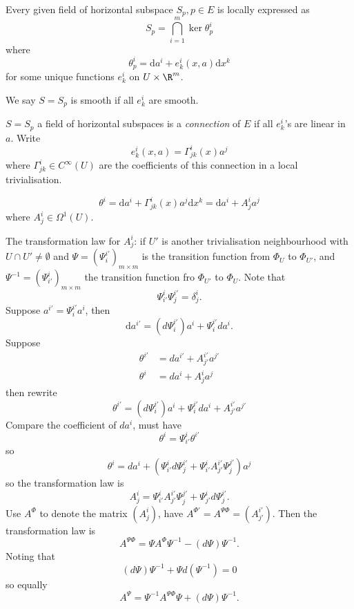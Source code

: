 \documentclass[a4paper]{article}
\begin{document}
\begin{proposition}
  Every given field of horizontal subspace \(S_p, p \in E\) is locally expressed as
  \[
    S_p = \bigcap_{i = 1}^m \ker \theta_p^i
  \]
  where
  \[
    \theta_p^i = \mathrm d a^i + e_k^i(x, a) \mathrm dx^k
  \]
  for some unique functions \(e_k^i\) on \(U \times \R^m\).

  We say \(S = S_p\) is smooth if all \(e_k^i\) are smooth.
\end{proposition}

\begin{definition}[connection]
  \(S = S_p\) a field of horizontal subspaces is a \emph{connection} of \(E\) if all \(e_k^i\)'s are linear in \(a\). Write
  \[
    e_k^i(x, a) = \Gamma_{jk}^i (x) a^j
  \]
  where \(\Gamma_{jk}^i \in C^\infty(U)\) are the coefficients of this connection in a local trivialisation.
\end{definition}

\[
  \theta^i = \mathrm d a^i + \Gamma_{jk}^i(x) a^j \mathrm dx^k
  = \mathrm d a^i + A^i_ja^j
\]
where \(A^i_j \in \Omega^1(U)\).

The transformation law for \(A^i_j\): if \(U'\) is another trivialisation neighbourhood with \(U \cap U' \neq \emptyset\) and \(\Psi = (\Psi^{i'}_i)_{m \times m}\) is the transition function from \(\Phi_U\) to \(\Phi_{U'}\), and \(\Psi^{-1} = (\Psi^i_{i'})_{m \times m}\) the transition function fro \(\Phi_{U'}\) to \(\Phi_U\). Note that
\[
  \Psi_{i'}^i \Psi_j^{i'} = \delta_j^i.
\]
Suppose \(a^{i'} = \Psi_i^{i'} a^i\), then
\[
  \mathrm d a^{i'} = (d \Psi_i^{i'}) a^i + \Psi_i^{i'} da^i.
\]
Suppose
\begin{align*}
  \theta^{i'} &= d a^{i'} + A_{j'}^{i'} a^{j'} \\
  \theta^i &= da^i + A_j^i a^j
\end{align*}
then rewrite
\[
  \theta^{i'} = (d \Psi_i^{i'}) a^i + \Psi_i^{i'} da^i + A_{j'}^{i'} a^{j'}
\]
Compare the coefficient of \(da^i\), must have
\[
  \theta^i = \Psi_{i'}^i \theta^{i'}
\]
so
\[
  \theta^i = da^i + (\Psi_{i'}^i d\Psi_j^{i'} + \Psi_{i'}^i A_{j'}^{i'} \Psi_j^{j'}) a^j
\]
so the transformation law is
\[
  A_j^i = \Psi_{i'}^i A_{j'}^{i'} \Psi_j^{j'} + \Psi_{j'}^i d\Psi_j^{i'}.
\]
Use \(A^\Phi\) to denote the matrix \((A_j^i)\), have \(A^{\Phi'} = A^{\Psi\Phi} = (A_{j'}^{i'})\). Then the transformation law is
\[
  A^{\Psi\Phi} = \Psi A^\Phi \Psi^{-1} - (d\Psi) \Psi^{-1}.
\]
Noting that
\[
  (d\Psi)\Psi^{-1} + \Psi d(\Psi^{-1}) = 0
\]
so equally
\[
  A^\Psi = \Psi^{-1}A^{\Psi\Phi} \Psi + (d\Psi)\Psi^{-1}.
\]
\end{document}
